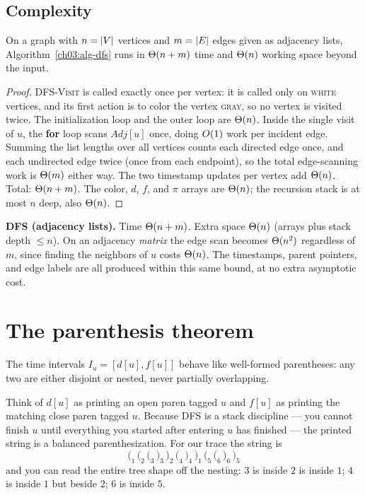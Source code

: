\subsection{Complexity}

\begin{theorem}\label{ch03:thm-linear}
On a graph with $n=\lvert V\rvert$ vertices and $m=\lvert E\rvert$ edges given as adjacency lists, Algorithm~\ref{ch03:alg-dfs} runs in $\Theta(n+m)$ time and $\Theta(n)$ working space beyond the input.
\end{theorem}

\begin{proof}
\textsc{DFS-Visit} is called exactly once per vertex: it is called only on \textsc{white} vertices, and its first action is to color the vertex \textsc{gray}, so no vertex is visited twice. The initialization loop and the outer loop are $\Theta(n)$. Inside the single visit of $u$, the \textbf{for} loop scans $\mathit{Adj}[u]$ once, doing $O(1)$ work per incident edge. Summing the list lengths over all vertices counts each directed edge once, and each undirected edge twice (once from each endpoint), so the total edge-scanning work is $\Theta(m)$ either way. The two timestamp updates per vertex add $\Theta(n)$. Total: $\Theta(n+m)$. The color, $d$, $f$, and $\pi$ arrays are $\Theta(n)$; the recursion stack is at most $n$ deep, also $\Theta(n)$.
\end{proof}

\begin{complexitybox}
\textbf{DFS (adjacency lists).} Time $\Theta(n+m)$. Extra space $\Theta(n)$ (arrays plus stack depth $\le n$). On an adjacency \emph{matrix} the edge scan becomes $\Theta(n^2)$ regardless of $m$, since finding the neighbors of $u$ costs $\Theta(n)$. The timestamps, parent pointers, and edge labels are all produced within this same bound, at no extra asymptotic cost.
\end{complexitybox}

\section{The parenthesis theorem}
\label{ch03:parenthesis}

The time intervals $I_u=[d[u],f[u]]$ behave like well-formed parentheses: any two are either disjoint or nested, never partially overlapping.

\begin{intuitionbox}
Think of $d[u]$ as printing an open paren tagged $u$ and $f[u]$ as printing the matching close paren tagged $u$. Because DFS is a stack discipline --- you cannot finish $u$ until everything you started after entering $u$ has finished --- the printed string is a balanced parenthesization. For our trace the string is
\[
\texttt{(}_1\,\texttt{(}_2\,\texttt{(}_3\,\texttt{)}_3\,\texttt{)}_2\,\texttt{(}_4\,\texttt{)}_4\,\texttt{)}_1\,\texttt{(}_5\,\texttt{(}_6\,\texttt{)}_6\,\texttt{)}_5
\]
and you can read the entire tree shape off the nesting: $3$ is inside $2$ is inside $1$; $4$ is inside $1$ but beside $2$; $6$ is inside $5$.
\end{intuitionbox}

